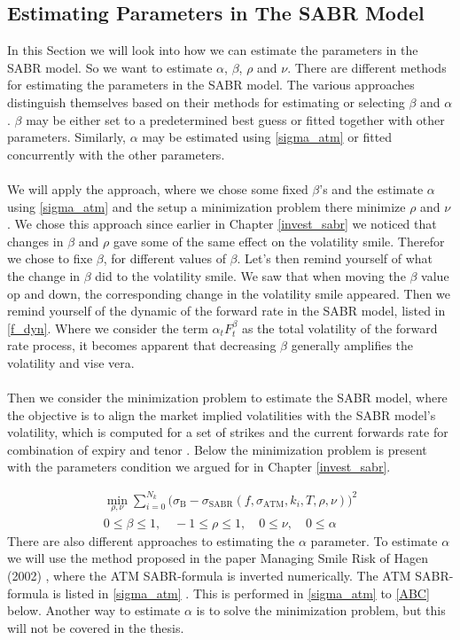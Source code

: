 \subsection{Estimating Parameters in The SABR Model} \label{est_parm_sabr}
In this Section we will look into how we can estimate the parameters in the SABR model.
So we want to estimate $\alpha$, $\beta$, $\rho$ and $\nu$.       
There are different methods for estimating the parameters in the SABR model. 
The various approaches distinguish themselves based on their methods for estimating or selecting $\beta$ and $\alpha$.
$\beta$ may be either set to a predetermined best guess or fitted together with other parameters.
Similarly, $\alpha$ may be estimated using \autoref{sigma_atm} or fitted concurrently with the other parameters.
\\\\
We will apply the approach, where we chose some fixed $\beta$'s and the estimate $\alpha$ using \autoref{sigma_atm}  and the
setup a minimization problem there minimize $\rho$ and $\nu$. We chose this approach since earlier in Chapter \ref{invest_sabr}
we noticed that changes in $\beta$ and $\rho$ gave some of the same effect on the volatility smile. Therefor we chose to fixe  $\beta$, for different
values of $\beta$. Let's then remind yourself of what the change in $\beta$ did to the volatility smile.
We saw that when moving the $\beta$ value op and down, the corresponding change in the volatility smile appeared. 
Then we remind yourself of the dynamic of the forward rate in the SABR model, listed in \autoref{f_dyn}. 
Where we consider the term  $\alpha_t F_t^\beta$ as the total volatility of the forward rate process,
it becomes apparent that decreasing $\beta$ generally amplifies the volatility and vise vera. 
\\\\
Then we consider the minimization problem to estimate the SABR model, where the objective is to align
the market implied volatilities with the SABR model's volatility, which is computed for a 
set of strikes and the current forwards rate for combination of expiry and tenor \cite{Lindstrom}. 
Below the minimization problem is present with the parameters condition we argued for in Chapter \ref{invest_sabr}.
 
\begin{align}
   \min_{\rho, \nu} \sum_{i=0}^{N_k} \Big(\sigma_{\text{B}} - 
    \sigma_{\text{SABR}}(f, \sigma_{\text{ATM}}, k_i, T, \rho, \nu)\Big)^2 \\
    0 \leq \beta \leq 1, \quad -1 \leq \rho \leq 1, \quad 0 \leq \nu, \quad 0 \leq \alpha
\end{align}
There are also different approaches to estimating the $\alpha$ parameter.
To estimate $\alpha$ we will use the method proposed in the paper Managing Smile Risk 
of Hagen (2002) \cite{Smile},
where the ATM SABR-formula is inverted numerically. The ATM SABR-formula is listed in \autoref{sigma_atm} \cite{Smile}.
This is performed in \autoref{sigma_atm} to \autoref{ABC} below.
Another way to estimate $\alpha$ is to solve the 
minimization problem, but this will not be covered in the thesis.

